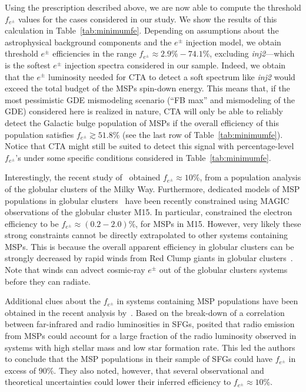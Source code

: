 \documentclass[doublespace,draft,nopageskip]{VTthesis} %
\begin{document}
Using the prescription described above, we are now able to compute the threshold $f_{e^\pm}$ values for the cases considered in our study. We show the results of this calculation in Table~\ref{tab:minimumfe}. Depending on assumptions about the astrophysical background components and the $e^\pm$ injection model, we obtain threshold $e^\pm$ efficiencies in the range $f_{e^\pm}\approx 2.9\%-74.1\%$, excluding \textit{inj2}---which is the softest $e^\pm$ injection spectra considered in our sample. Indeed, we obtain that the $e^\pm$ luminosity needed for CTA to detect a soft spectrum like \textit{inj2} would exceed the total budget of the MSPs spin-down energy. This means that, if the most pessimistic GDE mismodeling scenario (``FB max'' and mismodeling of the GDE) considered here is realized in nature,
CTA will only be able to reliably detect the Galactic bulge population of MSPs if the overall efficiency of this population satisfies $f_{e^\pm}\gtrsim 51.8\%$ (see the last row of Table~\ref{tab:minimumfe}). Notice that CTA might still be suited to detect this signal with percentage-level $f_{e^\pm}$'s under some specific conditions considered in Table~\ref{tab:minimumfe}.

Interestingly, the recent study of~\citet{Song:2021zrs} obtained $f_{e^\pm}\approx 10\%$, from a population analysis of the globular clusters of the Milky Way. Furthermore, dedicated models of MSP populations in globular clusters~\citep{Bednarek:2016gpp,Ndiyavala:2017hoh} have been recently constrained using MAGIC observations of the globular cluster M15. In particular, \cite{Acciari:2019ysf} constrained the electron efficiency to be $f_{e^{\pm}}\approx (0.2-2.0)\%$, for MSPs in M15. However, very likely these strong constraints cannot be directly extrapolated to other systems containing MSPs. This is because the overall apparent efficiency in globular clusters can be strongly decreased by rapid winds from Red Clump giants in globular clusters~\citep{Bednarek:2016gpp}. Note that winds can advect cosmic-ray $e^\pm$ out of the globular clusters systems before they can radiate.

Additional clues about the $f_{e^{\pm}}$ in systems containing MSP populations have been obtained in the recent analysis by~\citet{Sudoh:2020hyu}. 
%
Based on the break-down of a correlation 
between far-infrared and radio luminosities in SFGs, \citet{Sudoh:2020hyu} posited that radio emission from MSPs could account for a large fraction of the radio luminosity observed in systems with high stellar mass and low star formation rate. This led the authors to conclude that the MSP populations in their sample of SFGs could have $f_{e^{\pm}}$ in excess of $90\%$. They also noted, however, that several observational and theoretical uncertainties could lower their inferred efficiency to $f_{e^{\pm}}\approx 10\%$. 
\end{document}

